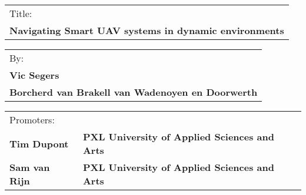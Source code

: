 \begin{tabular}{l}
  Title:\\
  \textbf{Navigating Smart UAV systems in dynamic environments}\\
\end{tabular}

\begin{tabular}{l}
  By:\\
  \textbf{Vic Segers}\\
  \textbf{Borcherd van Brakell van Wadenoyen en Doorwerth}\\
\end{tabular}

\begin{tabular}{l l}
  Promoters:\\
  \textbf{Tim Dupont} & \textbf{PXL University of Applied Sciences and Arts}\\
  \textbf{Sam van Rijn} & \textbf{PXL University of Applied Sciences and Arts}\\
  \hline
\end{tabular}